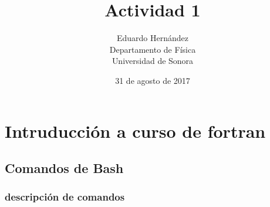\documentclass{article}
\title{Actividad 1}
\author{Eduardo Hernández \\ Departamento de Física \\ Universidad de Sonora}
\date { 31 de agosto de 2017}
\begin{document}
\maketitle
\section {Intruducción a curso de fortran}

\subsection{Comandos de Bash}
\subsubsection{descripción de comandos}

\end{document}
